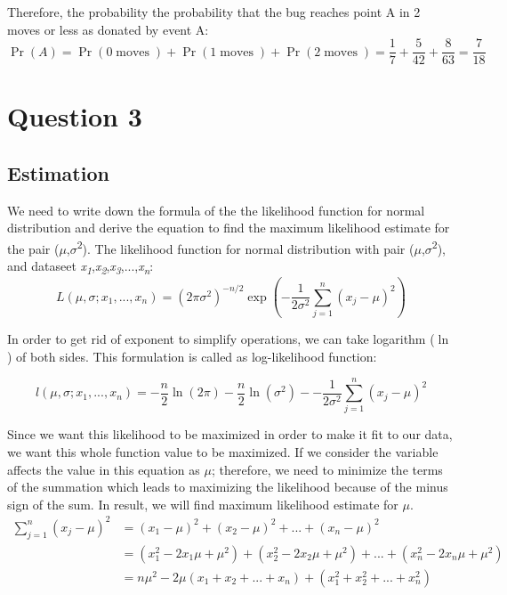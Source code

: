 \documentclass{article}
\DeclareMathOperator{\CondProb}{Pr}
\DeclareMathOperator{\moves}{moves}
\newcommand{\writex}[2]{{\it{#1\textsubscript#2}}}
\begin{document}
Therefore, the probability the probability that the bug reaches point A in 2 moves or less as donated by event A:
\begin{equation*}
	\CondProb{(A)} =  \CondProb{(0 \moves)} + \CondProb{(1\moves)}  + \CondProb{(2\moves)}= \frac{1}{7} +  \frac{5}{42} +  \frac{8}{63} = \boxed{\frac{7}{18}}
\end{equation*}

\section{Question 3}
\subsection{Estimation} \label{subsec:part3a}
We need to write down the formula of the the likelihood function for normal distribution and derive the equation to find the maximum likelihood estimate for the pair ($\mu$,$\sigma$\textsuperscript{2}).
\newline\newline
The likelihood function for normal distribution with pair ($\mu$,$\sigma$\textsuperscript{2}), and dataseet \writex{x}{1},\writex{x}{2},\writex{x}{3},...,\writex{x}{n}:
\begin{equation*}
	L\left(\mu,\sigma;x_1,...,x_n\right) = \left(2\pi\sigma^2\right)^{-n/2}\exp\left(-\frac{1}{2\sigma^2}\sum_{j=1}^{n} \left(x_j-\mu\right)^{2}\right)
\end{equation*}

In order to get rid of exponent to simplify operations, we can take logarithm ($\ln$) of both sides. This formulation is called as log-likelihood function:

\begin{equation*}
	l\left(\mu,\sigma;x_1,...,x_n\right) = -\frac{n}{2}\ln(2\pi)-\frac{n}{2}\ln\left(\sigma^{2}\right)--\frac{1}{2\sigma^2}\sum_{j=1}^{n} \left(x_j-\mu\right)^{2}
\end{equation*}

Since we want this likelihood to be maximized in order to make it fit to our data, we want this whole function value to be maximized. If we consider the variable affects the value in this equation as $\mu$; therefore, we need to minimize the terms of the summation which leads to maximizing the likelihood because of the minus sign of the sum. In result, we will find maximum likelihood estimate for $\mu$.  
\begin{equation*}
	\begin{aligned}
	\sum_{j=1}^{n} \left(x_j-\mu\right)^{2} &= \left(x_1-\mu\right)^{2} + \left(x_2-\mu\right)^{2} + ... + \left(x_n-\mu\right)^{2} \\
	&= \left(x_1^{2}-2x_1\mu +\mu^{2}\right) + \left(x_2^{2}-2x_2\mu +\mu^{2}\right) + ... + \left(x_n^{2}-2x_n\mu +\mu^{2}\right) \\
	&= n\mu^{2} -2\mu(x_1+x_2+...+x_n) + (x_1^{2}+x_2^{2}+...+x_n^{2})
	\end{aligned}
\end{equation*}
\end{document}
